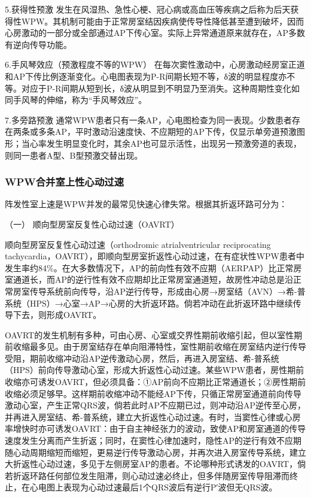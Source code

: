 5.获得性预激
发生在风湿热、急性心梗、冠心病或高血压等疾病之后称为后天获得性WPW。其机制可能由于正常房室结因疾病使传导性降低甚至遭到破坏，因而心房激动的一部分或全部通过AP下传心室。实际上异常通道原来就存在，AP多数有逆向传导功能。

6.手风琴效应（预激程度不等的WPW）
在每次窦性激动中，心房激动经房室正道和AP下传比例逐渐变化。心电图表现为P-R间期长短不等，δ波的明显程度亦不等。对应于P-R间期从短到长，δ波从明显到不明显乃至消失。这种周期性变化如同手风琴的伸缩，称为“手风琴效应”。

7.多旁路预激
通常WPW患者只有一条AP，心电图检查为同一表现。少数患者存在两条或多条AP，平时激动沿速度快、不应期短的AP下传，仅显示单旁道预激图形；当心率发生明显变化时，其余AP也可显示活性，出现另一预激旁道的表现，则同一患者A型、B型预激交替出现。

\subsubsection{WPW合并室上性心动过速}

阵发性室上速是WPW并发的最常见快速心律失常。根据其折返环路可分为：

\hypertarget{text00294.htmlux5cux23CHP10-2-7-1-3-1}{}
（一） 顺向型房室反复性心动过速（OAVRT）

顺向型房室反复性心动过速（orthodromic atrialventricular reciprocating
tachycardia，OAVRT），即顺向型房室折返性心动过速，在有症状性WPW患者中发生率约84\%。在大多数情况下，AP的前向性有效不应期（AERPAP）比正常房室通道长，而AP的逆行性有效不应期却比正常房室通道短，故房性冲动总是沿正常房室传导系统前向传导，沿AP逆行传导，形成由心房→房室结（AVN）→希-普系统（HPS）→心室→AP→心房的大折返环路。倘若冲动在此折返环路中继续传导下去，则形成OAVRT。

OAVRT的发生机制有多种，可由心房、心室或交界性期前收缩引起，但以室性期前收缩最多见。由于房室结存在单向阻滞特性，室性期前收缩在房室结内逆行传导受阻，期前收缩冲动沿AP逆传激动心房，然后，再进入房室结、希-普系统（HPS）前向传导激动心室，形成大折返性心动过速。某些WPW患者，房性期前收缩亦可诱发OAVRT，但必须具备：①AP前向不应期比正常通道长；②房性期前收缩必须足够早。这样期前收缩冲动不能经AP下传，只循正常房室通道前向传导激动心室，产生正常QRS波，倘若此时AP不应期已过，则冲动沿AP逆传至心房，并再进入房室结、希-普系统，建立大折返性心动过速。有时，当窦性心律或心房率增快时亦可诱发OAVRT：由于自主神经张力的波动，致使AP和房室通道的传导速度发生分离而产生折返；同时，在窦性心律加速时，隐性AP的逆行有效不应期随心动周期缩短而缩短，更易逆行传导激动心房，并再次进入房室传导系统，建立大折返性心动过速，多见于左侧房室AP的患者。不论哪种形式诱发的OAVRT，倘若折返环路任何部位发生阻滞，则心动过速必终止，但多伴随房室传导阻滞而终止，在心电图上表现为心动过速最后1个QRS波后有逆行P′波但无QRS波。

